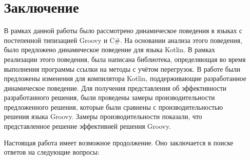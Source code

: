 \vfill
\clearpage
\section*{Заключение}



В рамках данной работы было рассмотрено динамическое поведения в языках с постепенной типизацией Groovy и C\#. На основании анализа этого поведения, было предложено динамическое поведение для языка Kotlin. В рамках реализации этого поведения, была написана библиотека, определяющая во время выполнения программы ссылки на методы с учётом перегрузок. В работе были предложены изменения для компилятора Kotlin, поддерживающие разработанное динамическое поведение. Для получения представления об эффективности разработанного решения, были проведены замеры производительности предложенного решения, которые были сравнены с производительностью решения языка Groovy.
Замеры производительности показали, что представленное решение эффективней решения Groovy.

Настоящая работа имеет возможное продолжение. Оно заключается в поиске ответов на следующие вопросы:

